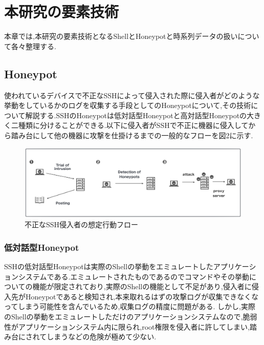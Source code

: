 \chapter{本研究の要素技術}
\label{issue}

本章では,本研究の要素技術となるShellとHoneypotと時系列データの扱いについて各々整理する.

\section{Honeypot}

使われているデバイスで不正なSSHによって侵入された際に侵入者がどのような挙動をしているかのログを収集する手段としてのHoneypotについて,その技術について解説する.SSHのHoneypot\cite{honeypot}は低対話型Honeypotと高対話型Honeypotの大きく二種類に分けることができる.以下に侵入者がSSHで不正に機器に侵入してから踏み台にして他の機器に攻撃を仕掛けるまでの一般的なフローを図2に示す.
\vspace{10mm}
\begin{figure}[H]
    \centering
    \includegraphics[width=1.0\textwidth]{figures/nagare.png}
    \caption{不正なSSH侵入者の想定行動フロー}
    \label{fig:evo}
\end{figure}


\subsection{低対話型Honeypot}
\label{issue:LowInteractionHoneypot}

SSHの低対話型Honeypotは実際のShellの挙動をエミュレートしたアプリケーションシステムである.エミュレートされたものであるのでコマンドやその挙動についての機能が限定されており,実際のShellの機能として不足があり,侵入者に侵入先がHoneypotであると検知され,本来取れるはずの攻撃ログが収集できなくなってしまう可能性を含んでいるため,収集ログの精度に問題がある.
しかし,実際のShellの挙動をエミュレートしただけのアプリケーションシステムなので,脆弱性がアプリケーションシステム内に限られ,root権限を侵入者に許してしまい,踏み台にされてしまうなどの危険が極めて少ない.


